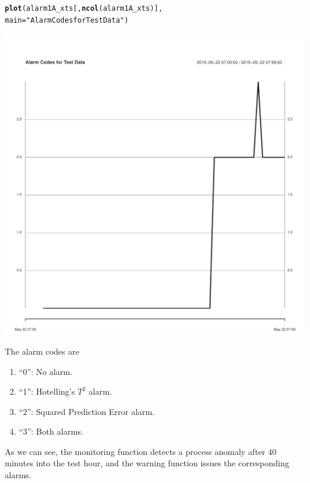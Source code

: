 \documentclass{report}\usepackage[]{graphicx}\usepackage[]{color}
\makeatletter
\def\maxwidth{ %
  \ifdim\Gin@nat@width>\linewidth
    \linewidth
  \else
    \Gin@nat@width
  \fi
}
\newcommand{\hlstr}[1]{\textcolor[rgb]{0.192,0.494,0.8}{#1}}%
\newcommand{\hlstd}[1]{\textcolor[rgb]{0.345,0.345,0.345}{#1}}%
\newcommand{\hlkwc}[1]{\textcolor[rgb]{0.333,0.667,0.333}{#1}}%
\newcommand{\hlkwd}[1]{\textcolor[rgb]{0.737,0.353,0.396}{\textbf{#1}}}%
\newenvironment{kframe}{%
 \def\at@end@of@kframe{}%
 \ifinner\ifhmode%
  \def\at@end@of@kframe{\end{minipage}}%
  \begin{minipage}{\columnwidth}%
 \fi\fi%
 \def\FrameCommand##1{\hskip\@totalleftmargin \hskip-\fboxsep
 \colorbox{shadecolor}{##1}\hskip-\fboxsep
     \hskip-\linewidth \hskip-\@totalleftmargin \hskip\columnwidth}%
 \MakeFramed {\advance\hsize-\width
   \@totalleftmargin\z@ \linewidth\hsize
   \@setminipage}}%
 {\par\unskip\endMakeFramed%
 \at@end@of@kframe}
\newenvironment{knitrout}{}{} %
\makeatother
\begin{document}
\begin{knitrout}
\color{fgcolor}\begin{kframe}
\begin{alltt}
\hlkwd{plot}\hlstd{(alarm1A_xts[,} \hlkwd{ncol}\hlstd{(alarm1A_xts)],}
     \hlkwc{main} \hlstd{=} \hlstr{"Alarm Codes for Test Data"}\hlstd{)}
\end{alltt}
\end{kframe}
\includegraphics[width=\maxwidth]{figure/r_warning_Plot-1} 

\end{knitrout}
The alarm codes are
\begin{enumerate}
\item ``0'': No alarm.
\item ``1'': Hotelling's $T^2$ alarm.
\item ``2'': Squared Prediction Error alarm.
\item ``3'': Both alarms.
\end{enumerate}
As we can see, the monitoring function detects a process anomaly after 40 minutes into the test hour, and the warning function issues the corresponding alarms.



\end{document}
